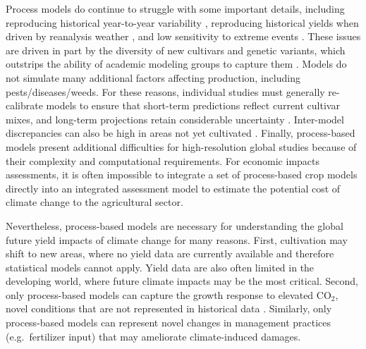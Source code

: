 \documentclass[preprint, 5p, times, twocolumn]{elsarticle}
\begin{document}
Process models do continue to struggle with some important details, including reproducing historical year-to-year variability \citep[e.g.][]{muller_global_2017}, reproducing historical yields when driven by reanalysis weather \citep[e.g.][]{Glotter14}, and low sensitivity to extreme events \citep[e.g.][]{Glotter15}. These issues are driven in part by the diversity of new cultivars and genetic variants, which outstrips the ability of academic modeling groups to capture them \citep[e.g.][]{JONES2017b}. Models do not simulate many additional factors affecting production, including pests/diseases/weeds. For these reasons, individual studies must generally re-calibrate models to ensure that short-term predictions reflect current cultivar mixes, and long-term projections retain considerable uncertainty \citep{WOLF2002217, JAGTAP200273, ANGULO201332, Asseng2013, Asseng2015}. Inter-model discrepancies can also be high in areas not yet cultivated \citep[e.g.][]{Challinor2014, WHITE2011357}. Finally, process-based models present additional difficulties for high-resolution global studies because of their complexity and computational requirements. For economic impacts assessments, it is often impossible to integrate a set of process-based crop models directly into an integrated assessment model to estimate the potential cost of climate change to the agricultural sector.

Nevertheless, process-based models are necessary for understanding the global future yield impacts of climate change for many reasons. First, cultivation may shift to new areas, where no yield data are currently available and therefore statistical models cannot apply. Yield data are also often limited in the developing world, where future climate impacts may be the most critical.  Second, only process-based models can capture the growth response to elevated CO$_2$, novel conditions that are not represented in historical data \citep[e.g.][]{pugh_climate_2016, Roberts2017}. Similarly, only process-based models can represent novel changes in management practices (e.g.\ fertilizer input) that may ameliorate climate-induced damages.
\end{document}
